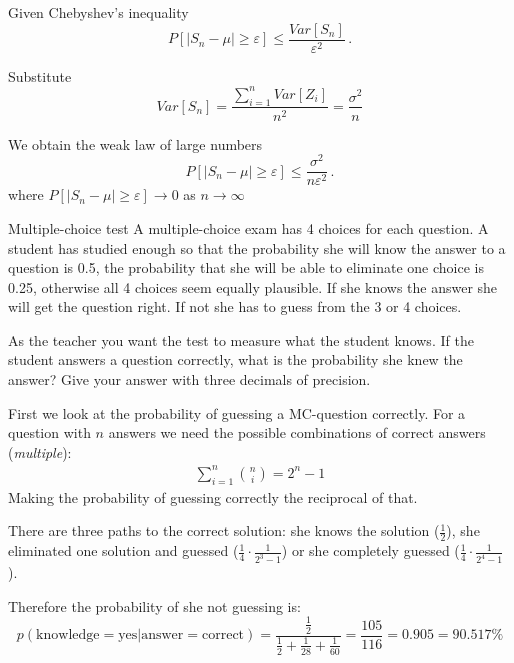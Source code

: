 \documentclass[a4paper,10pt]{article}
\begin{document}
\begin{solution}

Given Chebyshev's inequality
	\[
	P[|S_n - \mu| \geq \varepsilon] \leq \frac{Var[S_n]}{\varepsilon^2} \, .
	\]

Substitute $$Var[S_n]=\frac{\sum_{i=1}^n Var[Z_i]}{n^2}=\frac{\sigma^2}{n}$$

We obtain the weak law of large numbers
	\[
	P[|S_n - \mu| \geq \varepsilon] \leq \frac{\sigma^2}{n\varepsilon^2} \, .
	\]
where $P[|S_n - \mu| \geq \varepsilon] \to 0$ as $n \to \infty$
\end{solution}













\begin{nproblem}{3}{Multiple-choice test}
A multiple-choice exam has 4 choices for each question. A student has studied enough so that the probability she will know the answer to a question is 0.5, the probability that she will be able to eliminate one choice is 0.25, otherwise all 4 choices seem equally plausible. If she knows the answer she will get the question right. If not she has to guess from the 3 or 4 choices.

As the teacher you want the test to measure what the student knows. If the student answers a question correctly, what is the probability she knew the answer? Give your answer with three decimals of precision.


\begin{solution}
First we look at the probability of guessing a MC-question correctly. For a question with \(n\) answers we need the possible combinations of correct answers (\textit{multiple}):
\begin{align*}
    \sum_{i=1}^n {n\choose i} = 2^n - 1
\end{align*}
Making the probability of guessing correctly the reciprocal of that.

There are three paths to the correct solution: she knows the solution (\(\frac{1}{2}\)), she eliminated one solution and guessed (\(\frac{1}{4}\cdot\frac{1}{2^3 - 1}\)) or she completely guessed (\(\frac{1}{4}\cdot\frac{1}{2^4 - 1}\)).

Therefore the probability of she not guessing is:
\[
p(\text{knowledge}=\text{yes}|\text{answer}=\text{correct})
= \frac{\frac{1}{2}}{\frac{1}{2} + \frac{1}{28} + \frac{1}{60}} = \frac{105}{116} = 0.905 = 90.517\%
\]
\end{solution}
\end{nproblem}
\end{document}
